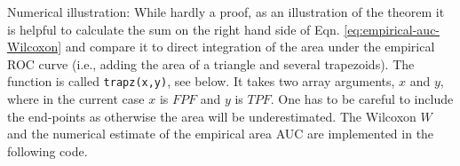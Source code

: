 \documentclass[
]{book}
\newenvironment{Shaded}{\begin{snugshade}}{\end{snugshade}}
\newcommand{\CommentTok}[1]{\textcolor[rgb]{0.56,0.35,0.01}{\textit{#1}}}
\newcommand{\ControlFlowTok}[1]{\textcolor[rgb]{0.13,0.29,0.53}{\textbf{#1}}}
\newcommand{\DecValTok}[1]{\textcolor[rgb]{0.00,0.00,0.81}{#1}}
\newcommand{\KeywordTok}[1]{\textcolor[rgb]{0.13,0.29,0.53}{\textbf{#1}}}
\newcommand{\NormalTok}[1]{#1}
\newcommand{\OperatorTok}[1]{\textcolor[rgb]{0.81,0.36,0.00}{\textbf{#1}}}
\newcommand{\StringTok}[1]{\textcolor[rgb]{0.31,0.60,0.02}{#1}}
\begin{document}
Numerical illustration: While hardly a proof, as an illustration of the theorem it is helpful to calculate the sum on the right hand side of Eqn. \eqref{eq:empirical-auc-Wilcoxon} and compare it to direct integration of the area under the empirical ROC curve (i.e., adding the area of a triangle and several trapezoids). The function is called \texttt{trapz(x,y)}, see below. It takes two array arguments, \(x\) and \(y\), where in the current case \(x\) is \(FPF\) and \(y\) is \(TPF\). One has to be careful to include the end-points as otherwise the area will be underestimated. The Wilcoxon \(W\) and the numerical estimate of the empirical area AUC are implemented in the following code.

\begin{Shaded}
\end{Shaded}
\end{document}
